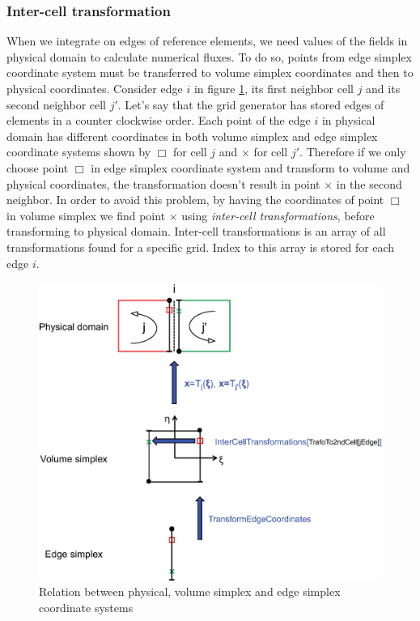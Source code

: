 \documentclass[BoSSSForSolvingConservationLaws.tex]{subfiles}
\begin{document}
\subsubsection*{Inter-cell transformation}
When we integrate on edges of reference elements, we need values of the fields in physical domain to calculate numerical fluxes. To do so, points from edge simplex coordinate system must be transferred to volume simplex coordinates and then to physical coordinates. Consider edge $i$ in figure \ref{fig:InterCellTransformation}, its first neighbor cell $j$ and its second neighbor cell $j'$. Let's say that the grid generator has stored edges of elements in a counter clockwise order. Each point of the edge $i$ in physical domain has different coordinates in both volume simplex and edge simplex coordinate systems shown by $\Box$ for cell $j$ and $\times$ for cell $j'$. Therefore if we only choose point $\Box$ in edge simplex coordinate system and transform to volume and physical coordinates, the transformation doesn't result in point $\times$ in the second neighbor. In order to avoid this problem, by having the coordinates of point $\Box$ in volume simplex we find point $\times$ using \emph{inter-cell transformations}, before transforming to physical domain. Inter-cell transformations is an array of all transformations found for a specific grid. Index to this array is stored for each edge $i$.
\begin{figure}[h]
\begin{center}
\includegraphics[width=13cm]{Figures/InterCellTransformation}
\end{center}
\caption{Relation between physical, volume simplex and edge simplex coordinate systems}
\label{fig:InterCellTransformation}
\end{figure}
\end{document}
